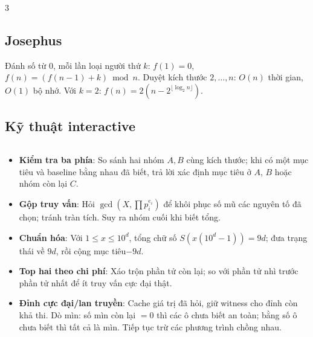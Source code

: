 \documentclass[landscape, 8pt, a4paper, oneside]{extarticle}
\begin{document}
\begin{multicols}{3}
\subsection{Josephus}
Đánh số từ 0, mỗi lần loại người thứ $k$: $f(1)=0$, $f(n)=(f(n-1)+k)\bmod n$. Duyệt kích thước $2,\ldots,n$: $O(n)$ thời gian, $O(1)$ bộ nhớ. Với $k=2$: $f(n)=2(n-2^{\lfloor\log_2 n\rfloor})$.

\subsection{Kỹ thuật interactive}
\inputminted[]{cpp}{source/cpp/utility/interactive.cpp}
\begin{itemize}
    \setlength{\itemsep}{0pt}
    \setlength{\parsep}{0pt}
    \item \textbf{Kiểm tra ba phía}: So sánh hai nhóm $A,B$ cùng kích thước; khi có một mục tiêu và baseline bằng nhau đã biết, trả lời xác định mục tiêu ở $A$, $B$ hoặc nhóm còn lại $C$.
    \item \textbf{Gộp truy vấn}: Hỏi $\gcd(X,\prod p_i^{e_i})$ để khôi phục số mũ các nguyên tố đã chọn; tránh tràn tích. Suy ra nhóm cuối khi biết tổng.
    \item \textbf{Chuẩn hóa}: Với $1\le x\le10^d$, tổng chữ số $S(x(10^d-1))=9d$; đưa trạng thái về $9d$, rồi cộng mục tiêu$-9d$.
    \item \textbf{Top hai theo chi phí}: Xáo trộn phần tử còn lại; so với phần tử nhì trước phần tử nhất để ít truy vấn cực đại thật.
    \item \textbf{Đỉnh cực đại/lan truyền}: Cache giá trị đã hỏi, giữ witness cho đỉnh còn khả thi. Dò mìn: số mìn còn lại $=0$ thì các ô chưa biết an toàn; bằng số ô chưa biết thì tất cả là mìn. Tiếp tục trừ các phương trình chồng nhau.
\end{itemize}


\end{multicols}
\end{document}
